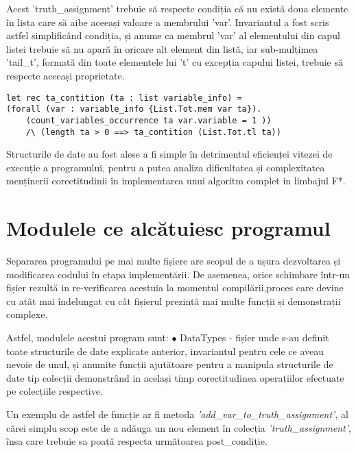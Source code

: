 Acest 'truth\_assignment' trebuie să respecte condiția că nu există doua elemente în lista care să aibe aceeași valoare a membrului 'var'. Invariantul a fost scris astfel simplificând condiția, și anume ca membrul 'var' al elementului din capul listei trebuie să nu apară în oricare alt element din listă, iar sub-mulțimea 'tail\_t', formată din toate elementele lui 't' cu excepția capului listei, trebuie să respecte aceeași proprietate.

\begin{lstlisting}[]
let rec ta_contition (ta : list variable_info) = 
(forall (var : variable_info {List.Tot.mem var ta}). 
	(count_variables_occurrence ta var.variable = 1 ))
	/\ (length ta > 0 ==> ta_contition (List.Tot.tl ta))

\end{lstlisting}

Structurile de date au fost alese a fi simple în detrimentul eficienței vitezei de execuție a programului, pentru a putea analiza dificultatea și complexitatea menținerii corectitudinii în implementarea unui algoritm complet in limbajul F*. 



\section{Modulele ce alcătuiesc programul}

Separarea programului pe mai multe fișiere are scopul de a ușura \newline dezvoltarea și modificarea codului în etapa implementării. De asemenea, orice \newline schimbare într-un fișier rezultă in re-verificarea acestuia la momentul compilării,\newline proces care devine cu atât mai îndelungat cu cât fișierul prezintă mai multe funcții și demonstrații complexe.

\newpage

Astfel, modulele acestui program sunt: \newline
$\bullet$ DataTypes - fișier unde s-au definit toate structurile de date explicate anterior, \newline invariantul pentru cele ce aveau nevoie de unul, și anumite funcții ajutătoare pentru a manipula structurile de date tip colecții demonstrând in același timp corectitudinea \newline operațiilor efectuate pe colecțiile respective. 

Un exemplu de astfel de funcție ar fi metoda
\textit{'add\_var\_to\_truth\_assignment'}, al cărei simplu scop este de a adăuga un nou element în colecția \textit{'truth\_assignment'}, însa care trebuie sa poată respecta următoarea post\_condiție.


